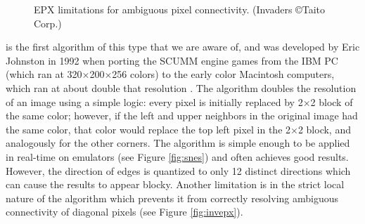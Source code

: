 \documentclass[]{usiinfbachelorproject}
\begin{document}
\begin{figure}
 	\centering
	\caption{EPX limitations for ambiguous pixel connectivity. (Invaders \copyright Taito Corp.)}
	\label{fig:epx}
\end{figure}

 is the first algorithm of this type that we are aware of, and was developed by Eric Johnston in 1992 when porting the SCUMM engine games from the IBM PC (which ran at 320$\times$200$\times$256 colors) to the early color Macintosh computers, which ran at about double that resolution \cite{Kas1999}. The algorithm doubles the resolution of an image using a simple logic: every pixel is initially replaced by 2$\times$2 block of the same color; however, if the left and upper neighbors in the original image had the same color, that color would replace the top left pixel in the 2$\times$2 block, and analogously for the other corners. The algorithm is simple enough to be applied in real-time on emulators (see Figure \ref{fig:snes}) and often achieves good results. However, the direction of edges is quantized to only 12 distinct directions which can cause the results to appear blocky. Another limitation is in the strict local nature of the algorithm which prevents it from correctly resolving ambiguous connectivity of diagonal pixels (see Figure \ref{fig:invepx}).\\
\end{document}
